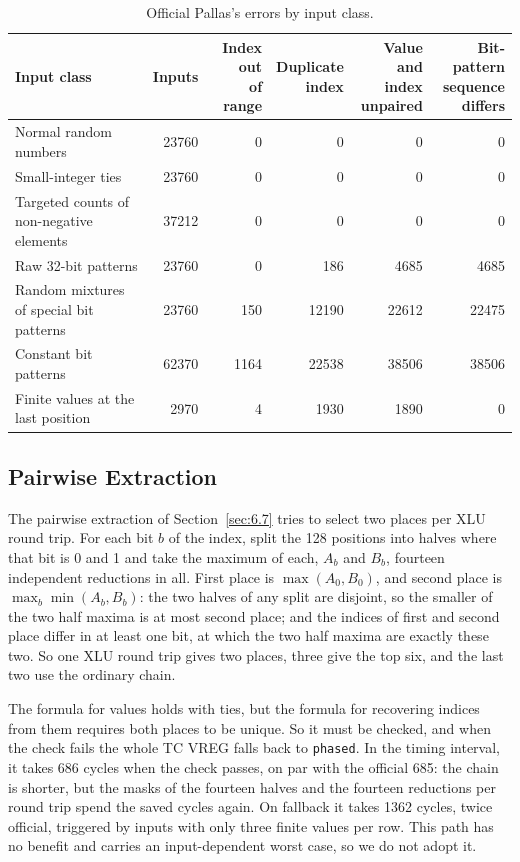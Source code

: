 \documentclass[sigconf,nonacm,balance=false]{acmart}
\newcommand{\code}[1]{\texttt{#1}}
\begin{document}
\begin{table}
\centering
\caption{Official Pallas's errors by input class.}
\label{tab:22}
\begin{tabular}{lrrrrr}
\toprule
Input class & Inputs & \makecell[rb]{Index out\\of range} & \makecell[rb]{Duplicate\\index} & \makecell[rb]{Value and\\index\\unpaired} & \makecell[rb]{Bit-pattern\\sequence\\differs} \\
\midrule
Normal random numbers & 23760 & 0 & 0 & 0 & 0 \\
Small-integer ties & 23760 & 0 & 0 & 0 & 0 \\
Targeted counts of non-negative elements & 37212 & 0 & 0 & 0 & 0 \\
Raw 32-bit patterns & 23760 & 0 & 186 & 4685 & 4685 \\
Random mixtures of special bit patterns & 23760 & 150 & 12190 & 22612 & 22475 \\
Constant bit patterns & 62370 & 1164 & 22538 & 38506 & 38506 \\
Finite values at the last position & 2970 & 4 & 1930 & 1890 & 0 \\
\bottomrule
\end{tabular}
\end{table}

\subsection{Pairwise Extraction}
\label{sec:C.4}

The pairwise extraction of Section~\ref{sec:6.7} tries to select two places per XLU round trip. For each bit $b$ of the index, split the 128 positions into halves where that bit is 0 and 1 and take the maximum of each, $A_b$ and $B_b$, fourteen independent reductions in all. First place is $\max(A_0, B_0)$, and second place is $\max_b \min(A_b, B_b)$: the two halves of any split are disjoint, so the smaller of the two half maxima is at most second place; and the indices of first and second place differ in at least one bit, at which the two half maxima are exactly these two. So one XLU round trip gives two places, three give the top six, and the last two use the ordinary chain.

The formula for values holds with ties, but the formula for recovering indices from them requires both places to be unique. So it must be checked, and when the check fails the whole TC VREG falls back to \code{phased}. In the timing interval, it takes 686 cycles when the check passes, on par with the official 685: the chain is shorter, but the masks of the fourteen halves and the fourteen reductions per round trip spend the saved cycles again. On fallback it takes 1362 cycles, twice official, triggered by inputs with only three finite values per row. This path has no benefit and carries an input-dependent worst case, so we do not adopt it.
\end{document}
